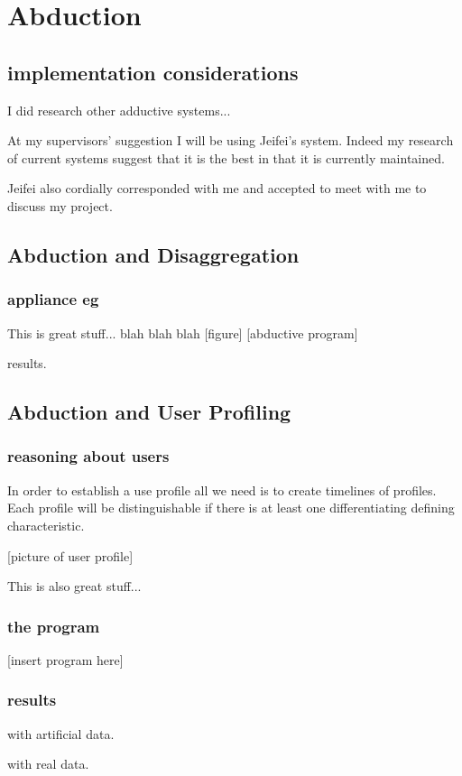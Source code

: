 \chapter{Abduction}

\section{implementation considerations}
I did research other adductive systems...

At my supervisors' suggestion I will be using Jeifei's system. Indeed my research of current systems suggest that it is the best in that it is currently maintained.

Jeifei also cordially corresponded with me and accepted to meet with me to discuss my project.


\section{Abduction and Disaggregation}

\subsection{appliance eg}

This is great stuff... blah blah blah
[figure]
[abductive program]

results.

\section{Abduction and User Profiling}


\subsection{reasoning about users}

In order to establish a use profile all we need is to create timelines of profiles. Each profile will be distinguishable if there is at least one differentiating defining characteristic.

[picture of user profile]


This is also great stuff... 

\subsection{the program}

[insert program here]


\subsection{results}

with artificial data.

with real data.